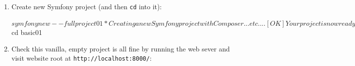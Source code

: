 \documentclass[a4paperpaper,openright]{book}
\newenvironment{Shaded}{}{}
\newcommand{\BuiltInTok}[1]{#1}
\newcommand{\ExtensionTok}[1]{#1}
\newcommand{\NormalTok}[1]{#1}
\begin{document}
\begin{enumerate}
\def\labelenumi{\arabic{enumi}.}
\item
  Create new Symfony project (and then \texttt{cd} into it):

\begin{Shaded}
\begin{Highlighting}[]
\NormalTok{    $ }\ExtensionTok{symfony}\NormalTok{ new --full project01}

    \ExtensionTok{*}\NormalTok{ Creating a new Symfony project with Composer}
    \ExtensionTok{...}\NormalTok{ etc. ...}

\NormalTok{    [}\ExtensionTok{OK}\NormalTok{] Your project is now ready in /Users/matt/Documents/Books/php-symfony-6-book/codes/part01/project01}

\NormalTok{    $ }\BuiltInTok{cd}\NormalTok{ basic01}
\end{Highlighting}
\end{Shaded}
\item
  Check this vanilla, empty project is all fine by running the web sever
  and visit website root at \texttt{http://localhost:8000/}:
\end{enumerate}
\end{document}

